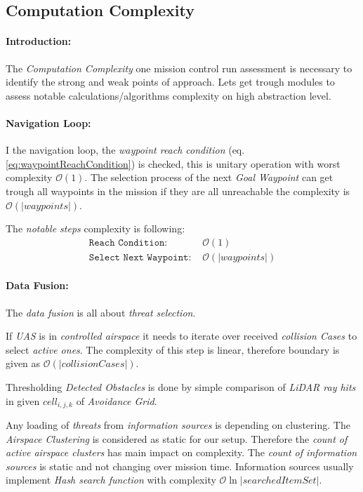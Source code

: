 \subsection{Computation Complexity}\label{sec:MCRcomputationalComplexity}
\paragraph{Introduction:}The \emph{Computation Complexity} one mission control run assessment is necessary to identify the strong and weak points of approach. Lets get trough modules to assess notable calculations/algorithms complexity on high abstraction level.

\paragraph{Navigation Loop:} I the navigation loop, the \emph{waypoint reach condition} (eq. \ref{eq:waypointReachCondition}) is checked, this is unitary operation with worst complexity $\mathscr{O}(1)$. The selection process of the next \emph{Goal Waypoint} can get trough all waypoints in the mission if they are all unreachable the complexity is $\mathscr{O}(|waypoints|)$.

The \emph{notable steps} complexity is following:
\begin{equation*}
    \begin{aligned}
        \texttt{Reach Condition: }& \mathscr{O}(1)\\
        \texttt{Select Next Waypoint: }&\mathscr{O}(|waypoints|)
    \end{aligned}
\end{equation*}

\paragraph{Data Fusion:} The \emph{data fusion} is all about \emph{threat selection}. 

If \emph{UAS} is in \emph{controlled airspace} it needs to iterate over received \emph{collision Cases} to select \emph{active ones}. The complexity of this step is linear, therefore boundary is given as $\mathscr{O} (|collision Cases|)$.

Thresholding \emph{Detected Obstacles} is done by simple comparison of \emph{LiDAR ray hits} in given $cell_{i,j,k}$ of \emph{Avoidance Grid}.

Any loading of \emph{threats} from \emph{information sources} is depending on clustering. The \emph{Airspace Clustering} is considered as static for our setup. Therefore the \emph{count of active airspace clusters} has main impact on complexity. The \emph{count of information sources} is static and not changing over mission time. Information sources usually implement \emph{Hash search function} with complexity $\mathscr{O}\ln|searched Item Set|$.

